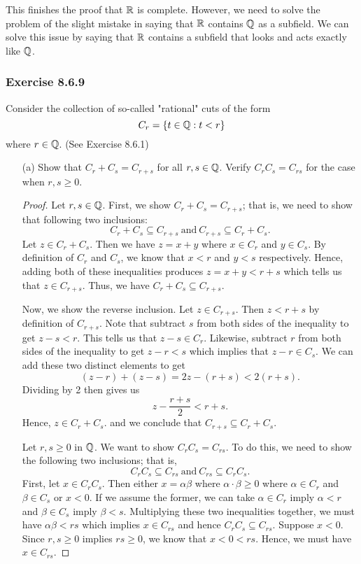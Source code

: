This finishes the proof that \( \mathbb{R}  \) is complete. However, we need to solve the problem of the slight mistake in saying that \( \mathbb{R}  \) contains \( \mathbb{Q}  \) as a subfield. We can solve this issue by saying that \( \mathbb{R}  \) contains a subfield that looks and acts exactly like \( \mathbb{Q}  \).

\subsubsection{Exercise 8.6.9} Consider the collection of so-called "rational" cuts of the form 
\[  C_{r} = \{ t \in \mathbb{Q}  : t < r \}  \]
where \( r \in \mathbb{Q}  \). (See Exercise 8.6.1)
\begin{enumerate}
    \item[(a)] Show that \( C_{r} + C_{s} = C_{r+s} \) for all \( r,s \in \mathbb{Q}  \). Verify \( C_{r} C_{s} = C_{rs} \) for the case when \( r, s \geq 0  \).
        \begin{proof}
       Let \( r,s \in \mathbb{Q}  \). First, we show \( C_{r} + C_{s} = C_{r+s} \); that is, we need to show that following two inclusions:
       \[  C_{r } + C_{s} \subseteq C_{r+s} \ \text{and} \ C_{r+s} \subseteq C_{r} + C_{s}.   \]
    Let \( z \in C_{r} + C_{s} \). Then we have \( z = x + y   \) where \( x \in C_{r}  \) and \( y \in C_{s} \). By definition of \( C_{r} \) and \( C_{s } \), we know that \( x < r  \) and \( y < s  \) respectively. Hence, adding both of these inequalities produces \( z = x + y < r + s  \) which tells us that \( z \in C_{r+s} \). Thus, we have \( C_{r} + C_{s} \subseteq C_{r+s} \). 

    Now, we show the reverse inclusion. Let \( z \in C_{r+s} \). Then \( z < r + s  \) by definition of \( C_{r+s} \). Note that subtract \( s  \) from both sides of the inequality to get \( z - s < r  \). This tells us that \( z - s \in C_{r}  \). Likewise, subtract \( r  \) from both sides of the inequality to get \( z - r < s  \) which implies that \( z -r  \in C_{s} \). We can add these two distinct elements to get 
    \[ (z-r) + (z-s) = 2z - (r+s) < 2(r+s). \]
    Dividing by 2 then gives us 
    \[  z - \frac{ r+s }{ 2 }  < r + s. \]
    Hence, \( z \in C_{r} + C_{s}. \) and we conclude that \( C_{r+s} \subseteq C_{r} + C_{s} \).

    Let \( r, s \geq 0  \) in \( \mathbb{Q}  \). We want to show \( C_{r} C_{s} = C_{rs} \). To do this, we need to show the following two inclusions; that is, 
    \[  C_{r} C_{s} \subseteq C_{rs} \ \text{and} \ C_{rs} \subseteq C_{r} C_{s}. \]
    First, let \( x \in C_{r}  C_{s}   \). Then either \( x = \alpha  \beta  \) where \( \alpha \cdot \beta \geq   0  \) where \( \alpha \in C_{r} \) and \( \beta \in C_{s} \) or \( x < 0 \). If we assume the former, we can take \( \alpha \in C_{r}  \) imply \( \alpha < r  \) and \( \beta \in C_{s}  \) imply \( \beta < s  \). Multiplying these two inequalities together, we must have \( \alpha \beta < rs  \) which implies \( x  \in C_{rs}  \) and hence \( C_{r} C_{s} \subseteq C_{rs} \). Suppose \( x < 0  \). Since \( r, s \geq 0  \) implies \( rs \geq  0  \), we know that \( x < 0 < rs \). Hence, we must have \( x \in C_{rs} \). 


\end{proof}
\end{enumerate}
